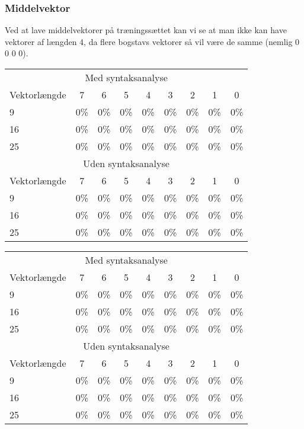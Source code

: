 \subsubsection*{Middelvektor}

Ved at lave middelvektorer på træningssættet kan vi se at man ikke kan have vektorer af længden 4, da flere bogstavs vektorer så vil være de samme (nemlig 0 0 0 0).

\begin{tabular}{|l|c|c|c|c|c|c|c|c|}\hline
\rowcolor[gray]{0.9} \multicolumn{9}{|>{\columncolor[gray]{0.9}}c|}{\textbf{Træningssæt}} \\\hline
\multicolumn{9}{|c|}{Med syntaksanalyse}\\\hline
Vektorlængde & 7 & 6 & 5 & 4 & 3 & 2 & 1 & 0\\\hline
9 & 0\% & 0\% & 0\% & 0\% & 0\% & 0\% & 0\% & 0\% \\\hline
16 & 0\% & 0\% & 0\% & 0\% & 0\% & 0\% & 0\% & 0\%\\\hline
25 & 0\% & 0\% & 0\% & 0\% & 0\% & 0\% & 0\% & 0\%\\\hline 
\multicolumn{9}{|c|}{Uden syntaksanalyse}\\\hline
Vektorlængde & 7 & 6 & 5 & 4 & 3 & 2 & 1 & 0\\\hline
9 & 0\% & 0\% & 0\% & 0\% & 0\% & 0\% & 0\% & 0\% \\\hline
16 & 0\% & 0\% & 0\% & 0\% & 0\% & 0\% & 0\% & 0\%\\\hline
25 & 0\% & 0\% & 0\% & 0\% & 0\% & 0\% & 0\% & 0\%\\\hline 
\end{tabular}

\begin{tabular}{|l|c|c|c|c|c|c|c|c|}\hline
\rowcolor[gray]{0.9} \multicolumn{9}{|>{\columncolor[gray]{0.9}}c|}{\textbf{Kontrolsæt}} \\\hline
\multicolumn{9}{|c|}{Med syntaksanalyse}\\\hline
Vektorlængde & 7 & 6 & 5 & 4 & 3 & 2 & 1 & 0\\\hline
9 & 0\% & 0\% & 0\% & 0\% & 0\% & 0\% & 0\% & 0\% \\\hline
16 & 0\% & 0\% & 0\% & 0\% & 0\% & 0\% & 0\% & 0\%\\\hline
25 & 0\% & 0\% & 0\% & 0\% & 0\% & 0\% & 0\% & 0\%\\\hline 
\multicolumn{9}{|c|}{Uden syntaksanalyse}\\\hline
Vektorlængde & 7 & 6 & 5 & 4 & 3 & 2 & 1 & 0\\\hline
9 & 0\% & 0\% & 0\% & 0\% & 0\% & 0\% & 0\% & 0\% \\\hline
16 & 0\% & 0\% & 0\% & 0\% & 0\% & 0\% & 0\% & 0\%\\\hline
25 & 0\% & 0\% & 0\% & 0\% & 0\% & 0\% & 0\% & 0\%\\\hline 
\end{tabular}

